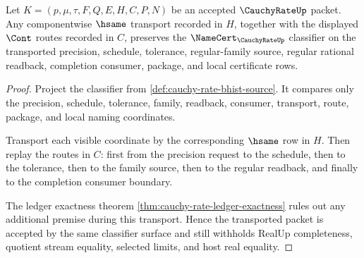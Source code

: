 \begin{theorem}
\label{thm:cauchy-rate-transport-stability}
Let $K=(p,\mu,\tau,F,Q,E,H,C,P,N)$ be an accepted $\CauchyRateUp$ packet. Any componentwise $\hsame$ transport recorded in $H$, together with the displayed $\Cont$ routes recorded in $C$, preserves the $\NameCert_{\CauchyRateUp}$ classifier on the transported precision, schedule, tolerance, regular-family source, regular rational readback, completion consumer, package, and local certificate rows.
\end{theorem}
\begin{proof}
Project the classifier from \autoref{def:cauchy-rate-bhist-source}. It compares only the precision, schedule, tolerance, family, readback, consumer, transport, route, package, and local naming coordinates.

Transport each visible coordinate by the corresponding $\hsame$ row in $H$. Then replay the routes in $C$: first from the precision request to the schedule, then to the tolerance, then to the family source, then to the regular readback, and finally to the completion consumer boundary.

The ledger exactness theorem \autoref{thm:cauchy-rate-ledger-exactness} rules out any additional premise during this transport. Hence the transported packet is accepted by the same classifier surface and still withholds RealUp completeness, quotient stream equality, selected limits, and host real equality.
\end{proof}

